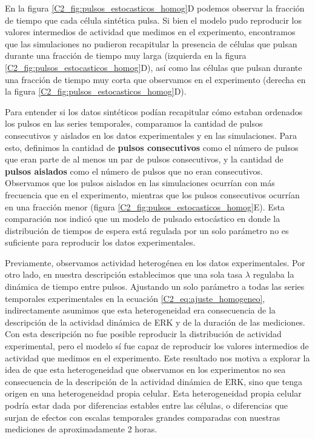 \documentclass[./main.tex]{subfiles}
\begin{document}
En la figura \ref{C2_fig:pulsos_estocasticos_homog}D podemos observar la fracción de tiempo que cada célula sintética pulsa. Si bien el modelo pudo reproducir los valores intermedios de actividad que medimos en el experimento, encontramos que las simulaciones no pudieron recapitular la presencia de células que pulsan durante una fracción de tiempo muy larga (izquierda en la figura \ref{C2_fig:pulsos_estocasticos_homog}D), así como las células que pulsan durante una fracción de tiempo muy corta que observamos en el experimento (derecha en la figura \ref{C2_fig:pulsos_estocasticos_homog}D). 


Para entender si los datos sintéticos podían recapitular cómo estaban ordenados los pulsos en las series temporales, comparamos la cantidad de pulsos consecutivos y aislados en los datos experimentales y en las simulaciones. Para esto, definimos la cantidad de \textbf{pulsos consecutivos} como el número de pulsos que eran parte de al menos un par de pulsos consecutivos, y la cantidad de \textbf{pulsos aislados} como el número de pulsos que no eran consecutivos. Observamos que los pulsos aislados en las simulaciones ocurrían con más frecuencia que en el experimento, mientras que los pulsos consecutivos ocurrían en una fracción menor (figura \ref{C2_fig:pulsos_estocasticos_homog}E). Esta comparación nos indicó que un modelo de pulsado estocástico en donde la distribución de tiempos de espera está regulada por un solo parámetro no es suficiente para reproducir los datos experimentales. 


Previamente, observamos actividad heterogénea en los datos experimentales. Por otro lado, en nuestra descripción establecimos que una sola tasa $\lambda$ regulaba la dinámica de tiempo entre pulsos. Ajustando un solo parámetro a todas las series temporales experimentales en la ecuación \ref{C2_eq:ajuste_homogeneo}, indirectamente asumimos que esta heterogeneidad era consecuencia de la descripción de la actividad dinámica de ERK y de la duración de las mediciones. Con esta descripción no fue posible reproducir la distribución de actividad experimental, pero el modelo sí fue capaz de reproducir los valores intermedios de actividad que medimos en el experimento. Este resultado nos motiva a explorar la idea de que esta heterogeneidad que observamos en los experimentos no sea consecuencia de la descripción de la actividad dinámica de ERK, sino que tenga origen en una heterogeneidad propia celular. Esta heterogeneidad propia celular podría estar dada por diferencias estables entre las células, o diferencias que surjan de efectos con escalas temporales grandes comparadas con nuestras mediciones de aproximadamente 2 horas. 
\end{document}
